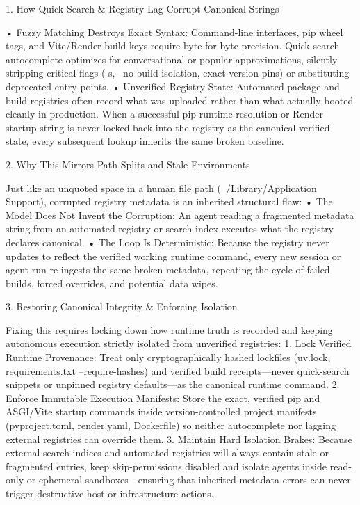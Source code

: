 1. How Quick-Search & Registry Lag Corrupt Canonical Strings

• Fuzzy Matching Destroys Exact Syntax: Command-line interfaces, pip wheel tags, and Vite/Render build keys require byte-for-byte precision. Quick-search autocomplete optimizes for conversational or popular approximations, silently stripping critical flags (-s, --no-build-isolation, exact version pins) or substituting deprecated entry points.
• Unverified Registry State: Automated package and build registries often record what was uploaded rather than what actually booted cleanly in production. When a successful pip runtime resolution or Render startup string is never locked back into the registry as the canonical verified state, every subsequent lookup inherits the same broken baseline.

2. Why This Mirrors Path Splits and Stale Environments

Just like an unquoted space in a human file path (~/Library/Application Support), corrupted registry metadata is an inherited structural flaw:
• The Model Does Not Invent the Corruption: An agent reading a fragmented metadata string from an automated registry or search index executes what the registry declares canonical.
• The Loop Is Deterministic: Because the registry never updates to reflect the verified working runtime command, every new session or agent run re-ingests the same broken metadata, repeating the cycle of failed builds, forced overrides, and potential data wipes.

3. Restoring Canonical Integrity & Enforcing Isolation

Fixing this requires locking down how runtime truth is recorded and keeping autonomous execution strictly isolated from unverified registries:
1. Lock Verified Runtime Provenance: Treat only cryptographically hashed lockfiles (uv.lock, requirements.txt --require-hashes) and verified build receipts—never quick-search snippets or unpinned registry defaults—as the canonical runtime command.
2. Enforce Immutable Execution Manifests: Store the exact, verified pip and ASGI/Vite startup commands inside version-controlled project manifests (pyproject.toml, render.yaml, Dockerfile) so neither autocomplete nor lagging external registries can override them.
3. Maintain Hard Isolation Brakes: Because external search indices and automated registries will always contain stale or fragmented entries, keep skip-permissions disabled and isolate agents inside read-only or ephemeral sandboxes—ensuring that inherited metadata errors can never trigger destructive host or infrastructure actions.

